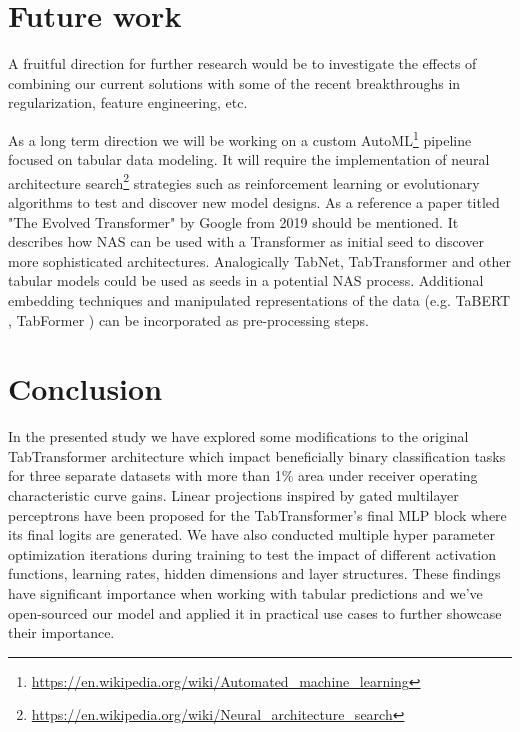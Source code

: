 \documentclass{article}
\begin{document}
\section{Future work}

A fruitful direction for further research would be to investigate the effects of combining our current solutions with some of the recent breakthroughs in regularization, feature engineering, etc.

As a long term direction we will be working on a custom AutoML\footnote{\url{https://en.wikipedia.org/wiki/Automated_machine_learning}} pipeline focused on tabular data modeling. It will require the implementation of neural architecture search\footnote{\url{https://en.wikipedia.org/wiki/Neural_architecture_search}} strategies such as reinforcement learning or evolutionary algorithms \cite{elsken2019neural} to test and discover new model designs. As a reference a paper titled "The Evolved Transformer" \cite{so2019evolved} by Google from 2019 should be mentioned. It describes how NAS can be used with a Transformer \cite{vaswani2017attention} as initial seed to discover more sophisticated architectures. Analogically TabNet, TabTransformer and other tabular models could be used as seeds in a potential NAS process. Additional embedding techniques and manipulated representations of the data (e.g. TaBERT \cite{yin2020tabert}, TabFormer \cite{padhi2021tabular}) can be incorporated as pre-processing steps.

\section{Conclusion}

In the presented study we have explored some modifications to the original TabTransformer \cite{Huang2020TabTransformerTD} architecture which impact beneficially binary classification tasks for three separate datasets with more than 1\% area under receiver operating characteristic curve gains. Linear projections inspired by gated multilayer perceptrons \cite{Liu2021PayAT} have been proposed for the TabTransformer's final MLP block where its final logits are generated. We have also conducted multiple hyper parameter optimization iterations during training to test the impact of different activation functions, learning rates, hidden dimensions and layer structures. These findings have significant importance when working with tabular predictions and we've open-sourced our model and applied it in practical use cases to further showcase their importance.
\end{document}
